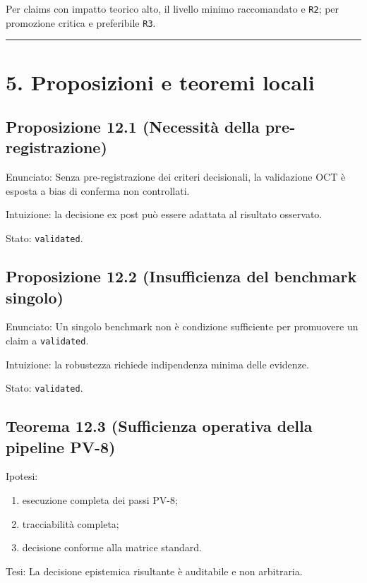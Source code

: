 Per claims con impatto teorico alto, il livello minimo raccomandato e \texttt{R2}; per promozione critica e preferibile \texttt{R3}.

\begin{center}\rule{0.5\linewidth}{0.5pt}\end{center}

\section{5. Proposizioni e teoremi locali}

\subsection{Proposizione 12.1 (Necessità della pre-registrazione)}

Enunciato:
Senza pre-registrazione dei criteri decisionali, la validazione OCT è esposta a bias di conferma non controllati.

Intuizione:
la decisione ex post può essere adattata al risultato osservato.

Stato: \texttt{validated}.

\subsection{Proposizione 12.2 (Insufficienza del benchmark singolo)}

Enunciato:
Un singolo benchmark non è condizione sufficiente per promuovere un claim a \texttt{validated}.

Intuizione:
la robustezza richiede indipendenza minima delle evidenze.

Stato: \texttt{validated}.

\subsection{Teorema 12.3 (Sufficienza operativa della pipeline PV-8)}

Ipotesi:

\begin{enumerate}
\def\labelenumi{\arabic{enumi}.}
\tightlist
\item
  esecuzione completa dei passi PV-8;
\item
  tracciabilità completa;
\item
  decisione conforme alla matrice standard.
\end{enumerate}

Tesi:
La decisione epistemica risultante è auditabile e non arbitraria.


